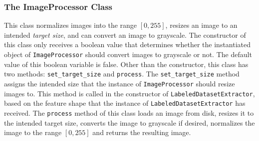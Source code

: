 \documentclass[14pt]{extarticle}
\begin{document}
		\subsubsection{The ImageProcessor Class}
		This class normalizes images into the range $[0, 255]$, resizes an image to an intended \textit{target size}, and can convert an image to grayscale. The constructor of this class only receives a boolean value that determines whether the instantiated object of \texttt{ImageProcessor} should convert images to grayscale or not. The default value of this boolean variable is false. Other than the constructor, this class has two methods: \texttt{set\_target\_size} and \texttt{process}. The \texttt{set\_target\_size} method assigns the intended size that the instance of \texttt{ImageProcessor} should resize images to. This method is called in the constructor of \texttt{LabeledDatasetExtractor}, based on the feature shape that the instance of \texttt{LabeledDatasetExtractor} has received. The \texttt{process} method of this class loads an image from disk, resizes it to the intended target size, converts the image to grayscale if desired, normalizes the image to the range $[0, 255]$ and returns the resulting image.
	
	
\end{document}
